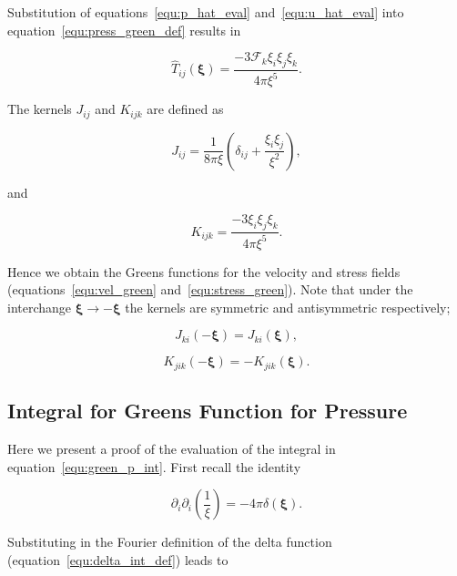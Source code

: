 \documentclass[12pt]{article}
\begin{document}
Substitution of equations~\ref{equ:p_hat_eval} and~\ref{equ:u_hat_eval} into equation~\ref{equ:press_green_def} results in

\begin{equation}
\label{equ:green_stress}
\hat{T}_{ij} (\boldsymbol\xi) = \frac{-3 \mathcal{F}_{k} \xi_{i} \xi_{j} \xi_{k}}{4 \pi \xi^{5}}.
\end{equation}


The kernels $J_{ij}$ and $K_{ijk}$ are defined as

\begin{equation}
\label{equ:j_kernel}
J_{ij} = \frac{1}{8 \pi \xi} \left(\delta_{ij} + \frac{\xi_{i} \xi_{j}}{\xi^{2}} \right),
\end{equation}

and 

\begin{equation}
\label{equ:k_kernel}
K_{ijk} = \frac{-3 \xi_{i} \xi_{j} \xi_{k}}{4 \pi \xi^{5}}.
\end{equation}

Hence we obtain the Greens functions for the velocity and stress fields (equations~\ref{equ:vel_green} and~\ref{equ:stress_green}). Note that under the interchange $\boldsymbol\xi \to -\boldsymbol\xi$ the kernels are symmetric and antisymmetric respectively;

\begin{equation}
\label{equ:j_sym}
J_{ki}(-\boldsymbol\xi) = J_{ki}(\boldsymbol\xi),
\end{equation}

\begin{equation}
\label{equ:k_sym}
K_{jik}(-\boldsymbol\xi) = -K_{jik}(\boldsymbol\xi).
\end{equation}


\subsection{Integral for Greens Function for Pressure}
\label{sub_app:green_p}

Here we present a proof of the evaluation of the integral in equation~\ref{equ:green_p_int}. First recall the identity \citep{Jackson99, Frahm82}

\begin{equation}
\label{equ:laplace_recip_squared}
\partial_{i} \partial_{i}\left(\frac{1}{\xi}\right) = -4 \pi \delta(\boldsymbol{\xi}).
\end{equation}


Substituting in the Fourier definition of the delta function (equation~\ref{equ:delta_int_def}) leads to
\end{document}
